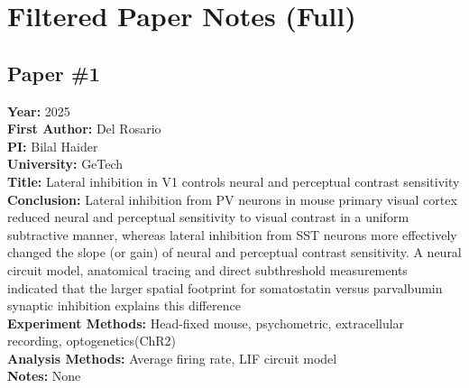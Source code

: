 \documentclass[11pt]{article}
\begin{document}
\section*{Filtered Paper Notes (Full)}



\subsection*{Paper \#1}
\textbf{Year:} 2025 \\
\textbf{First Author:} Del Rosario \\
\textbf{PI:} Bilal Haider \\
\textbf{University:} GeTech \\
\textbf{Title:} Lateral inhibition in V1 controls neural and perceptual contrast sensitivity \\
\textbf{Conclusion:} Lateral inhibition from PV neurons in mouse primary visual cortex
reduced neural and perceptual sensitivity to visual contrast in a uniform
subtractive manner, whereas lateral inhibition from SST neurons
more effectively changed the slope (or gain) of neural and perceptual
contrast sensitivity. A neural circuit model, anatomical tracing and direct
subthreshold measurements indicated that the larger spatial footprint
for somatostatin versus parvalbumin synaptic inhibition explains this
difference \\
\textbf{Experiment Methods:} Head-fixed mouse, psychometric, extracellular recording, optogenetics(ChR2) \\
\textbf{Analysis Methods:} Average firing rate, LIF circuit model \\
\textbf{Notes:} None \\

\end{document}
